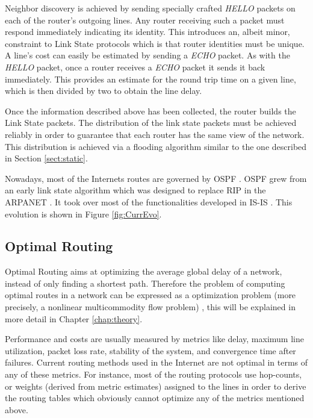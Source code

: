 Neighbor discovery is achieved by sending specially crafted \textit{HELLO} packets on each of the router's outgoing lines. Any router receiving such a packet must respond immediately indicating its identity. This introduces an, albeit minor, constraint to Link State protocols which is that router identities must be unique. A line's cost can easily be estimated by sending a \textit{ECHO} packet. As with the \textit{HELLO} packet, once a router receives a \textit{ECHO} packet it sends it back immediately. This provides an estimate for the round trip time on a given line, which is then divided by two to obtain the line delay.

Once the information described above has been collected, the router builds the Link State packets. The distribution of the link state packets must be achieved reliably in order to guarantee that each router has the same view of the network. This distribution is achieved via a flooding algorithm similar to the one described in Section \ref{sect:static}.

Nowadays, most of the Internets routes are governed by OSPF \cite{OSPF}. OSPF grew from an early link state algorithm which was designed to replace RIP \cite{RIP} in the ARPANET \cite{ARPAROUTE}. It took over most of the functionalities developed in IS-IS \cite{RFC3787}. This evolution is shown in Figure \ref{fig:CurrEvo}.

\subsection{Optimal Routing}

Optimal Routing aims at optimizing the average global delay of a network, instead of only finding a shortest path. Therefore the problem of computing optimal routes in a network can be expressed as a optimization problem (more precisely, a nonlinear multicommodity flow problem) \cite{CANTOR74}, this will be explained in more detail in Chapter \ref{chap:theory}.

 Performance and costs are usually measured by metrics like delay, maximum line utilization, packet loss rate, stability of the system, and convergence time after failures. Current routing methods used in the Internet are not optimal in terms of any of these metrics. For instance, most of the routing protocols use hop-counts, or weights (derived from metric estimates) assigned to the lines in order to derive the routing tables which obviously cannot optimize any of the metrics mentioned above. 

